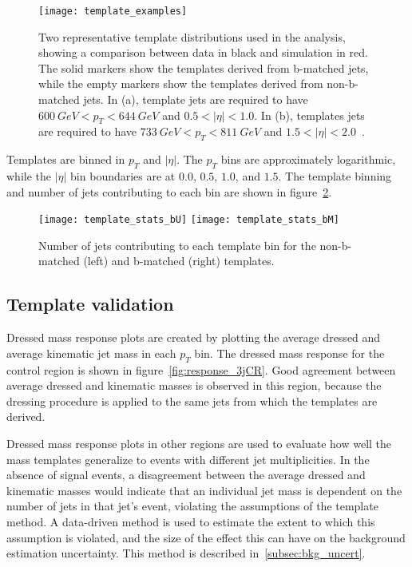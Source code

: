 \begin{figure}[!ht]
    \centering
    \texttt{[image: template\_examples]}
    \caption{Two representative template distributions used in the analysis, showing a comparison between data in black and simulation in red.
    The solid markers show the templates derived from b-matched jets, while the empty markers show the templates derived from non-b-matched jets.
    In (a), template jets are required to have $600~GeV < p_{T} < 644~GeV$ and $0.5 <|\eta|<1.0$.
    In (b), templates jets are required to have $733~GeV < p_{T} < 811~GeV$ and $1.5<|\eta|<2.0$~\cite{paper-plb}.}
    \label{fig:template_examples}
\end{figure}

Templates are binned in $p_T$ and $|\eta|$.
The $p_T$ bins are approximately logarithmic, while the $|\eta|$ bin boundaries are at $0.0$, $0.5$, $1.0$, and $1.5$.
The template binning and number of jets contributing to each bin are shown in figure~\ref{fig:template_stats}.

\begin{figure}[!ht]
    \texttt{[image: template\_stats\_bU]}
    \texttt{[image: template\_stats\_bM]}
    \caption{Number of jets contributing to each template bin for the non-b-matched (left) and b-matched (right) templates.}
    \label{fig:template_stats}
\end{figure}

\subsection{Template validation} \label{subsec:template_validation}
Dressed mass response plots are created by plotting the average dressed and average kinematic jet mass in each $p_T$ bin.
The dressed mass response for the control region is shown in figure~\ref{fig:response_3jCR}.
Good agreement between average dressed and kinematic masses is observed in this region, because the dressing procedure is applied to the same jets from which the templates are derived.

Dressed mass response plots in other regions are used to evaluate how well the mass templates generalize to events with different jet multiplicities.
In the absence of signal events, a disagreement between the average dressed and kinematic masses would indicate that an individual jet mass is
dependent on the number of jets in that jet's event, violating the assumptions of the template method.
A data-driven method is used to estimate the extent to which this assumption is violated, and the size of the effect this can have on the background estimation uncertainty.
This method is described in~\ref{subsec:bkg_uncert}.

